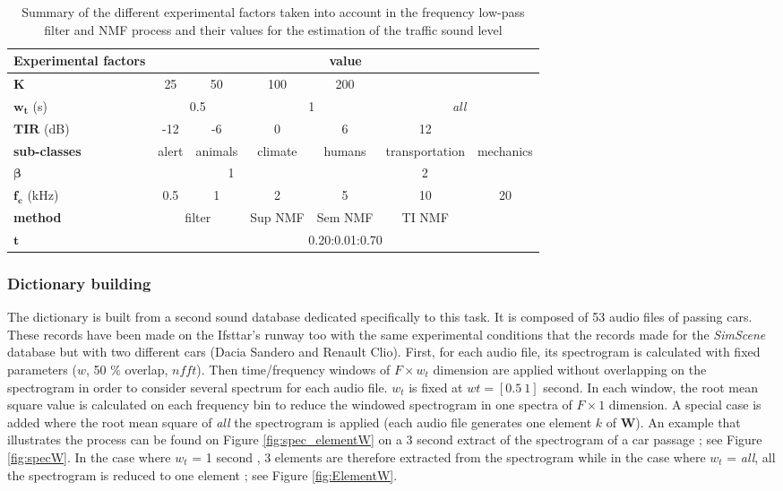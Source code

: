 \documentclass[twocolumn,a4paper,10pt]{article}
\begin{document}
\begin{table}[t]
\centering
\begin{tabular}{lcccccc}
\textbf{Experimental factors} &  \multicolumn{6}{c}{value}\\ \toprule
$\mathbf{K}$ & 25 & 50 & 100 & 200 & & \\
\rowcolor[HTML]{EFEFEF}
$\mathbf{w_t}$ (s)& \multicolumn{2}{c}{0.5} & \multicolumn{2}{c}{1}  & \multicolumn{2}{c}{\textit{all}} \\
$\mathbf{TIR}$ (dB) & -12 & -6 & 0 & 6 & 12 &  \\
\rowcolor[HTML]{EFEFEF}
\textbf{sub-classes} & alert & animals & climate & humans & transportation & mechanics \\
$\mathbf{\beta}$ & \multicolumn{3}{c}{1} & \multicolumn{3}{c}{2} \\
\rowcolor[HTML]{EFEFEF}
$\mathbf{f_c}$ (kHz) & 0.5 & 1 & 2 & 5 & 10 & 20 \\
\textbf{method} & \multicolumn{2}{c}{filter} & Sup NMF & Sem NMF & TI NMF \\
\rowcolor[HTML]{EFEFEF}
$\mathbf{t}$ & \multicolumn{6}{c}{0.20:0.01:0.70} \\ \bottomrule
\end{tabular}
\caption{Summary of the different experimental factors taken into account in the frequency low-pass filter and NMF process and their values for the estimation of the traffic sound level}
\label{tab:experimental_factors}
\end{table}


\subsubsection{Dictionary building}\label{part:dictionary_learning}

The dictionary is built from a second sound database dedicated specifically to this task. It is composed of 53 audio files of passing cars. These records have been made on the Ifsttar's runway too with the same experimental conditions that the records made for the \textit{SimScene} database but with two different cars (Dacia Sandero and Renault Clio). First, for each audio file, its spectrogram is calculated with fixed parameters ($w$, 50 $\%$ overlap, $nfft$). Then time/frequency windows of $F \times w_t $ dimension are applied without overlapping on the spectrogram in order to consider several spectrum for each audio file. $w_t$ is fixed at $wt = [0.5~1]$ second. In each window, the root mean square value is calculated on each frequency bin to reduce the windowed spectrogram in one spectra of $F \times 1$ dimension.  A special case is added where the root mean square of \textit{all} the spectrogram is applied (each audio file generates one element $k$ of $\mathbf{W}$). An example that illustrates the process can be found on Figure \ref{fig:spec_elementW} on a 3 second extract of the spectrogram of a car passage ; see Figure \ref{fig:specW}. In the case where $w_t$ = 1 second , 3 elements are therefore extracted from the spectrogram while in the case where $w_t$ = \textit{all}, all the spectrogram is reduced to one element ; see Figure \ref{fig:ElementW}.
\end{document}

